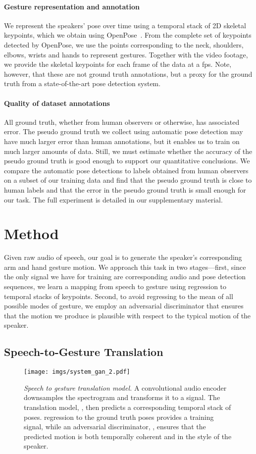 \documentclass[10pt,twocolumn,letterpaper]{article}
\newcommand{\mypar}[1]{\vspace{-2mm}\paragraph{#1}}
\begin{document}
\mypar{Gesture representation and annotation}  We represent the speakers' pose over time using a temporal stack of 2D skeletal keypoints, which we obtain using OpenPose~\cite{cao2017realtime}. From the complete set of keypoints detected by OpenPose, we use the  points corresponding to the neck, shoulders, elbows, wrists and hands to represent gestures. Together with the video footage, we provide the skeletal keypoints for each frame of the data at a fps. Note, however, that these are not ground truth annotations, but a proxy for the ground truth from a state-of-the-art pose detection system.

\mypar{Quality of dataset annotations} All ground truth, whether from human observers or otherwise, has associated error. The pseudo ground truth we collect using automatic pose detection may have much larger error than human annotations, but it enables us to train on much larger amounts of data. Still, we must estimate whether the accuracy of the pseudo ground truth is good enough to support our quantitative conclusions. We compare the automatic pose detections to labels obtained from human observers on a subset of our training data and find that the pseudo ground truth is close to human labels and that the error in the pseudo ground truth is small enough for our task. The full experiment is detailed in our supplementary material.

\section{Method}
\label{sec:method}
Given raw audio of speech, our goal is to generate the speaker's corresponding arm and hand gesture motion. We approach this task in two stages---first, since the only signal we have for training are corresponding audio and pose detection sequences, we learn a mapping from speech to gesture using  regression to temporal stacks of  keypoints. Second, to avoid regressing to the mean of all possible modes of gesture, we employ an adversarial discriminator that ensures that the motion we produce is plausible with respect to the typical motion of the speaker.

\subsection{Speech-to-Gesture Translation}
\label{sec:translation-arch}

\begin{figure}
\centering
\texttt{[image: imgs/system\_gan\_2.pdf]}
\vspace{-4mm}
  \caption{\emph{Speech to gesture translation model.} A convolutional audio encoder downsamples the  spectrogram and transforms it to a  signal. The translation model, , then predicts a corresponding temporal stack of  poses.  regression to the ground truth poses provides a training signal, while an adversarial discriminator, , ensures that the predicted motion is both temporally coherent and in the style of the speaker.}
\label{fig:translation-arch}
\end{figure}
\end{document}
